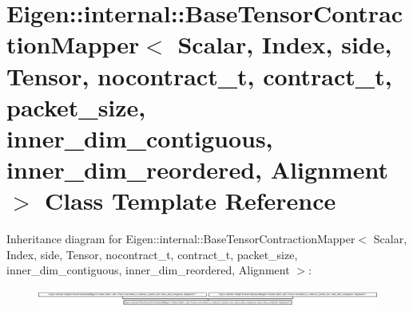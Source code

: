 \hypertarget{class_eigen_1_1internal_1_1_base_tensor_contraction_mapper}{}\section{Eigen\+:\+:internal\+:\+:Base\+Tensor\+Contraction\+Mapper$<$ Scalar, Index, side, Tensor, nocontract\+\_\+t, contract\+\_\+t, packet\+\_\+size, inner\+\_\+dim\+\_\+contiguous, inner\+\_\+dim\+\_\+reordered, Alignment $>$ Class Template Reference}
\label{class_eigen_1_1internal_1_1_base_tensor_contraction_mapper}
Inheritance diagram for Eigen\+:\+:internal\+:\+:Base\+Tensor\+Contraction\+Mapper$<$ Scalar, Index, side, Tensor, nocontract\+\_\+t, contract\+\_\+t, packet\+\_\+size, inner\+\_\+dim\+\_\+contiguous, inner\+\_\+dim\+\_\+reordered, Alignment $>$\+:\begin{figure}[H]
\begin{center}
\leavevmode
\includegraphics[height=0.557214cm]{class_eigen_1_1internal_1_1_base_tensor_contraction_mapper}
\end{center}
\end{figure}
